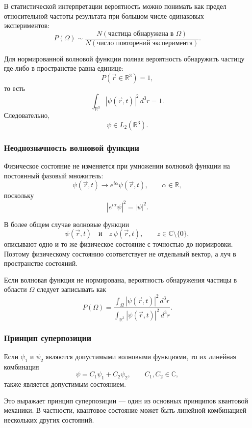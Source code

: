 \documentclass[12pt,a4paper]{article}
\begin{document}
В статистической интерпретации вероятность можно понимать как предел
относительной частоты результата при большом числе одинаковых
экспериментов:
\[
    P(\Omega)
    \sim
    \frac{
        N(\text{частица обнаружена в }\Omega)
    }{
        N(\text{число повторений эксперимента})
    }.
\]

Для нормированной волновой функции полная вероятность обнаружить
частицу где-либо в пространстве равна единице:
\[
    \boxed{
        P(\vec r\in\mathbb R^3)=1
    },
\]
то есть
\[
    \boxed{
        \int_{\mathbb R^3}
            |\psi(\vec r,t)|^2\,d^3r
        =
        1
    }.
\]
Следовательно,
\[
    \psi\in L_2(\mathbb R^3).
\]

\subsubsection{Неоднозначность волновой функции}

Физическое состояние не изменяется при умножении волновой функции на
постоянный фазовый множитель:
\[
    \psi(\vec r,t)
    \longrightarrow
    e^{i\alpha}\psi(\vec r,t),
    \qquad
    \alpha\in\mathbb R,
\]
поскольку
\[
    \left|
        e^{i\alpha}\psi
    \right|^2
    =
    |\psi|^2.
\]

В более общем случае волновые функции
\[
    \psi(\vec r,t)
    \quad\text{и}\quad
    z\,\psi(\vec r,t),
    \qquad
    z\in\mathbb C\setminus\{0\},
\]
описывают одно и то же физическое состояние с точностью до
нормировки. Поэтому физическому состоянию соответствует не отдельный
вектор, а луч в пространстве состояний.

Если волновая функция не нормирована, вероятность обнаружения частицы
в области $\Omega$ следует записывать как
\[
    \boxed{
    P(\Omega)
    =
    \frac{
        \displaystyle
        \int_\Omega
            |\psi(\vec r,t)|^2\,d^3r
    }{
        \displaystyle
        \int_{\mathbb R^3}
            |\psi(\vec r,t)|^2\,d^3r
    }
    }.
\]

\subsubsection{Принцип суперпозиции}

Если $\psi_1$ и $\psi_2$ являются допустимыми волновыми функциями, то
их линейная комбинация
\[
    \boxed{
        \psi
        =
        C_1\psi_1+C_2\psi_2
    },
    \qquad
    C_1,C_2\in\mathbb C,
\]
также является допустимым состоянием.

Это выражает принцип суперпозиции --- один из основных принципов
квантовой механики. В частности, квантовое состояние может быть
линейной комбинацией нескольких других состояний.
\end{document}
